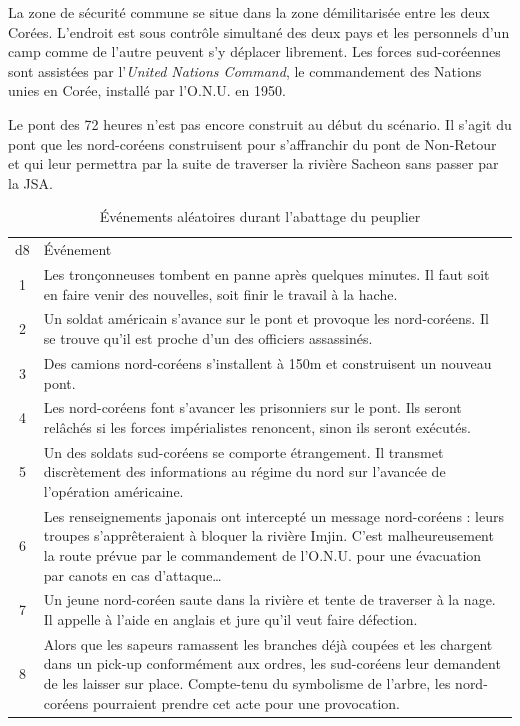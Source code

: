 \begin{tcolorbox}[colback=black!1!white]
La zone de sécurité commune se situe dans la zone démilitarisée entre les deux Corées.
L'endroit est sous contrôle simultané des deux pays et les personnels d'un camp comme de l'autre peuvent s'y déplacer librement.
Les forces sud-coréennes sont assistées par l'\emph{United Nations Command}, le commandement des Nations unies en Corée, installé par l'O.N.U. en 1950.

Le pont des 72 heures n'est pas encore construit au début du scénario. Il s'agit du pont que les nord-coréens construisent pour s'affranchir du pont de Non-Retour et qui leur permettra par la suite de traverser la rivière Sacheon sans passer par la JSA.
\end{tcolorbox}

\begin{table}
	\caption{Événements aléatoires durant l'abattage du peuplier}
	\label{table:peuplier}
	\begin{tabularx}{\textwidth}{cX}
	d8 & Événement\\
	1  & Les tronçonneuses tombent en panne après quelques minutes. Il faut soit en faire venir des nouvelles, soit finir le travail à la hache.\\
	2  & Un soldat américain s'avance sur le pont et provoque les nord-coréens. Il se trouve qu'il est proche d'un des officiers assassinés.\\
	3  & Des camions nord-coréens s'installent à 150m et construisent un nouveau pont.\\
	4  & Les nord-coréens font s'avancer les prisonniers sur le pont. Ils seront relâchés si les forces impérialistes renoncent, sinon ils seront exécutés.\\
	5  & Un des soldats sud-coréens se comporte étrangement. Il transmet discrètement des informations au régime du nord sur l'avancée de l'opération américaine.\\
	6  & Les renseignements japonais ont intercepté un message nord-coréens : leurs troupes s'apprêteraient à bloquer la rivière Imjin. C'est malheureusement la route prévue par le commandement de l'O.N.U. pour une évacuation par canots en cas d'attaque\dots\\
	7  & Un jeune nord-coréen saute dans la rivière et tente de traverser à la nage. Il appelle à l'aide en anglais et jure qu'il veut faire défection.\\
	8  & Alors que les sapeurs ramassent les branches déjà coupées et les chargent dans un pick-up conformément aux ordres, les sud-coréens leur demandent de les laisser sur place. Compte-tenu du symbolisme de l'arbre, les nord-coréens pourraient prendre cet acte pour une provocation.\\
	\end{tabularx}
\end{table}

\vfill
{}
\vfill
